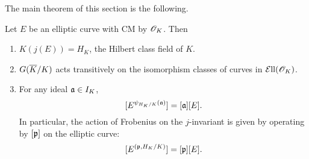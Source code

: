 The main theorem of this section is the following.
\begin{thm}
Let $E$ be an elliptic curve with CM by $\mathscr{O}_K$. Then
\begin{enumerate}
\item $K(j(E))=H_K$, the Hilbert class field of $K$.
\item $G(\overline{K}/K)$ acts transitively on the isomorphism classes of 
curves in $\mathcal{E}{\rm{ll}}(\mathscr{O}_K)$.
\item For any ideal $\mathfrak{a}\in I_K$,
\[
[E^{\psi_{H_K/K}(\mathfrak{a})}]=[\mathfrak{a}][E].
\]
In particular, the action of Frobenius on the $j$-invariant is given by operating by $[\mathfrak{p}]$ on the elliptic curve:
\[
[E^{(\mathfrak{p},H_K/K)}]=[\mathfrak{p}][E].
\]
\end{enumerate}
\end{thm}
